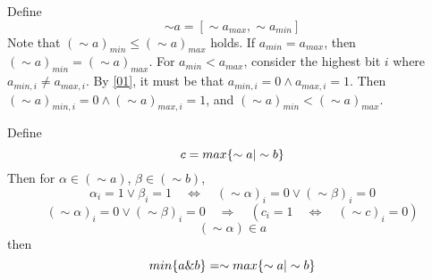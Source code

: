 \documentclass{article}
\begin{document}
Define 
\begin{equation*}
\sim a = [\sim a_{max}, \sim a_{min}]
\end{equation*}
Note that $(\sim a)_{min} \le (\sim a)_{max}$ holds. 
If $a_{min} = a_{max}$, then 
$(\sim a)_{min} = (\sim a)_{max}$.
For $a_{min} < a_{max}$, consider the highest bit $i$ where 
$a_{min,i} \ne a_{max,i}$. By \eqref{01}, it must be that 
$a_{min,i} = 0 \wedge a_{max,i} = 1$. 
Then
$(\sim a)_{min,i} = 0 \wedge (\sim a)_{max,i} = 1$, and 
$(\sim a)_{min} < (\sim a)_{max}$. 

Define
\begin{equation*}
c = max\{\sim a \text{\textbar} \sim b\}
\end{equation*}
Then for $\alpha \in (\sim a)$, $\beta \in (\sim b)$,
\begin{equation*}
\alpha_i = 1 \vee \beta_i = 1 \quad \Leftrightarrow \quad 
(\sim \alpha)_i = 0 \vee (\sim \beta)_i = 0
\end{equation*}
\begin{equation*}
(\sim \alpha)_i = 0 \vee (\sim \beta)_i = 0 \quad \Rightarrow \quad 
(c_i = 1 \quad \Leftrightarrow \quad (\sim c)_i = 0)
\end{equation*}
\begin{equation*}
(\sim \alpha) \in a
\end{equation*}
then
\begin{equation}
min\{a\text{\&}b\} = 
\sim max\{\sim a \text{\textbar} \sim b\}
\end{equation}
\end{document}
